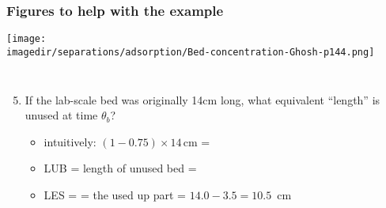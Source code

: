 \begin{frame}\frametitle{Figures to help with the example}
	\begin{center}
		\texttt{[image: \\imagedir/separations/adsorption/Bed-concentration-Ghosh-p144.png]}
	\end{center}
	\vspace{-16pt}
	\begin{columns}[t]
		\begin{enumerate}
			\setcounter{enumi}{4}
			\item	If the lab-scale bed was originally 14cm long, what equivalent ``length'' is unused at time $\theta_b$?
				\begin{itemize}
					\item	intuitively: $(1 - 0.75) \times 14$\,cm = {\color{myOrange}{3.5 cm}}
					\item	LUB = length of unused bed = {\color{myOrange}{3.5 cm}}
					\item	LES = {\color{purple}{length of equilibrium section}} = the used up part = $14.0 - 3.5 = 10.5$~cm
				\end{itemize}
		\end{enumerate}
	\end{columns}
\end{frame}

